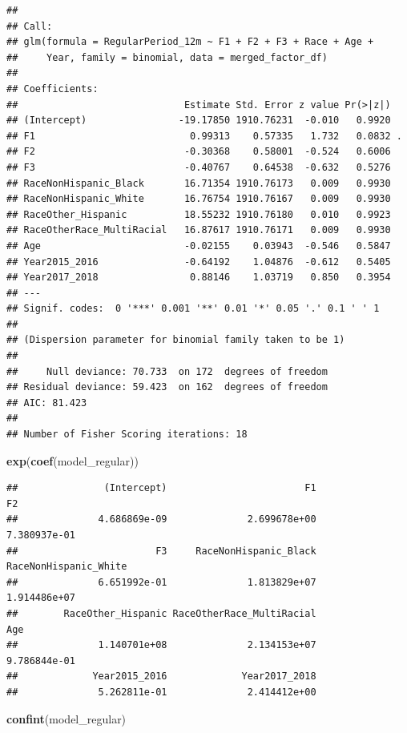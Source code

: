 \documentclass[
]{article}
\newenvironment{Shaded}{\begin{snugshade}}{\end{snugshade}}
\newcommand{\FunctionTok}[1]{\textcolor[rgb]{0.13,0.29,0.53}{\textbf{#1}}}
\newcommand{\NormalTok}[1]{#1}
\begin{document}
\begin{verbatim}
## 
## Call:
## glm(formula = RegularPeriod_12m ~ F1 + F2 + F3 + Race + Age + 
##     Year, family = binomial, data = merged_factor_df)
## 
## Coefficients:
##                             Estimate Std. Error z value Pr(>|z|)  
## (Intercept)                -19.17850 1910.76231  -0.010   0.9920  
## F1                           0.99313    0.57335   1.732   0.0832 .
## F2                          -0.30368    0.58001  -0.524   0.6006  
## F3                          -0.40767    0.64538  -0.632   0.5276  
## RaceNonHispanic_Black       16.71354 1910.76173   0.009   0.9930  
## RaceNonHispanic_White       16.76754 1910.76167   0.009   0.9930  
## RaceOther_Hispanic          18.55232 1910.76180   0.010   0.9923  
## RaceOtherRace_MultiRacial   16.87617 1910.76171   0.009   0.9930  
## Age                         -0.02155    0.03943  -0.546   0.5847  
## Year2015_2016               -0.64192    1.04876  -0.612   0.5405  
## Year2017_2018                0.88146    1.03719   0.850   0.3954  
## ---
## Signif. codes:  0 '***' 0.001 '**' 0.01 '*' 0.05 '.' 0.1 ' ' 1
## 
## (Dispersion parameter for binomial family taken to be 1)
## 
##     Null deviance: 70.733  on 172  degrees of freedom
## Residual deviance: 59.423  on 162  degrees of freedom
## AIC: 81.423
## 
## Number of Fisher Scoring iterations: 18
\end{verbatim}

\begin{Shaded}
\begin{Highlighting}[]
\FunctionTok{exp}\NormalTok{(}\FunctionTok{coef}\NormalTok{(model\_regular))}
\end{Highlighting}
\end{Shaded}

\begin{verbatim}
##               (Intercept)                        F1                        F2 
##              4.686869e-09              2.699678e+00              7.380937e-01 
##                        F3     RaceNonHispanic_Black     RaceNonHispanic_White 
##              6.651992e-01              1.813829e+07              1.914486e+07 
##        RaceOther_Hispanic RaceOtherRace_MultiRacial                       Age 
##              1.140701e+08              2.134153e+07              9.786844e-01 
##             Year2015_2016             Year2017_2018 
##              5.262811e-01              2.414412e+00
\end{verbatim}

\begin{Shaded}
\begin{Highlighting}[]
\FunctionTok{confint}\NormalTok{(model\_regular)}
\end{Highlighting}
\end{Shaded}
\end{document}
